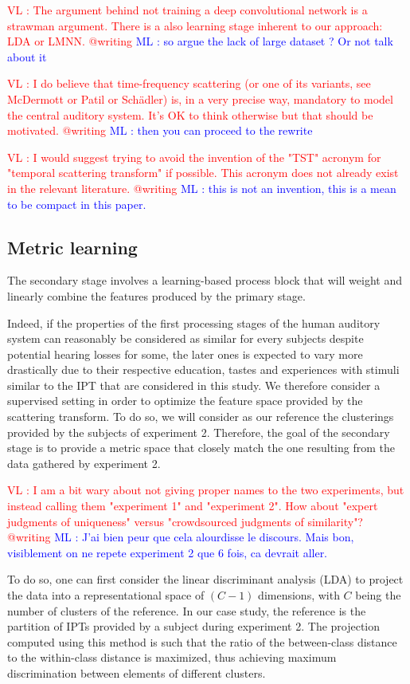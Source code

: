 \documentclass{article}
\newcommand{\ipt}{IPT\xspace}
\newcommand{\ipts}{IPTs\xspace}
\newcommand{\ml}[1]{\textcolor{blue}{ML : #1}}
\newcommand{\vl}[1]{\textcolor{red}{VL : #1}}
\begin{document}
\vl{The argument behind not training a deep convolutional network is a strawman argument.
There is a also learning stage inherent to our approach: LDA or LMNN. @writing}
\ml{so argue the lack of large dataset ? Or not talk about it}

\vl{I do believe that time-frequency scattering (or one of its variants, see McDermott or Patil or Sch\"{a}dler)
is, in a very precise way, mandatory to model the central auditory system. It's OK to think otherwise but that
should be motivated. @writing}
\ml{then you can proceed to the rewrite}

\vl{I would suggest trying to avoid the invention of the "TST" acronym for "temporal scattering transform" if possible.
This acronym does not already exist in the relevant literature. @writing}
\ml{this is not an invention, this is a mean to be compact in this paper.}

\subsection{Metric learning} \label{sec:consensus}

The secondary stage involves a learning-based process block that will weight and linearly combine the features produced by the primary stage.

Indeed, if the properties of the first processing stages of the human auditory system can reasonably be considered as similar for every subjects despite potential hearing losses for some, the later ones is expected to vary more drastically due to their respective education, tastes and experiences with stimuli similar to the \ipt that are considered in this study. We therefore consider a supervised setting in order to optimize the feature space provided by the scattering transform. To do so, we will consider as our reference the clusterings provided by the subjects of experiment 2. Therefore, the goal of the secondary stage is to provide a metric space that closely match the one resulting from the data gathered by experiment 2.

\vl{I am a bit wary about not giving proper names to the two experiments, but instead calling them "experiment 1" and "experiment 2".
How about "expert judgments of uniqueness" versus "crowdsourced judgments of similarity"? @writing}
\ml{J'ai bien peur que cela alourdisse le discours. Mais bon, visiblement on ne repete experiment 2 que 6 fois, ca devrait aller.}

To do so, one can first consider the linear discriminant analysis (LDA) \cite{duda2000pattern} to project the data into a representational space of $(C-1)$ dimensions, with $C$ being the number of clusters of the reference. In our case study, the reference is the partition of \ipts provided by a subject during experiment 2. The projection computed using this method is such that the ratio of the between-class distance to the within-class distance is maximized, thus achieving maximum discrimination between elements of different clusters.
\end{document}
